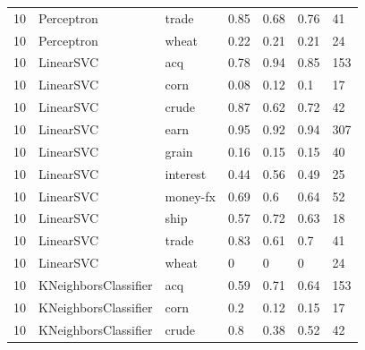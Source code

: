 \documentclass{article}
\begin{document}
\begin{table}[h]
\begin{tabular}{lllllll}
10            & Perceptron             & trade           & 0.85               & 0.68            & 0.76              & 41               \\
10            & Perceptron             & wheat           & 0.22               & 0.21            & 0.21              & 24               \\
10            & LinearSVC              & acq             & 0.78               & 0.94            & 0.85              & 153              \\
10            & LinearSVC              & corn            & 0.08               & 0.12            & 0.1               & 17               \\
10            & LinearSVC              & crude           & 0.87               & 0.62            & 0.72              & 42               \\
10            & LinearSVC              & earn            & 0.95               & 0.92            & 0.94              & 307              \\
10            & LinearSVC              & grain           & 0.16               & 0.15            & 0.15              & 40               \\
10            & LinearSVC              & interest        & 0.44               & 0.56            & 0.49              & 25               \\
10            & LinearSVC              & money-fx        & 0.69               & 0.6             & 0.64              & 52               \\
10            & LinearSVC              & ship            & 0.57               & 0.72            & 0.63              & 18               \\
10            & LinearSVC              & trade           & 0.83               & 0.61            & 0.7               & 41               \\
10            & LinearSVC              & wheat           & 0                  & 0               & 0                 & 24               \\
10            & KNeighborsClassifier   & acq             & 0.59               & 0.71            & 0.64              & 153              \\
10            & KNeighborsClassifier   & corn            & 0.2                & 0.12            & 0.15              & 17               \\
10            & KNeighborsClassifier   & crude           & 0.8                & 0.38            & 0.52              & 42               \\

\end{tabular}
\end{table}
\end{document}
